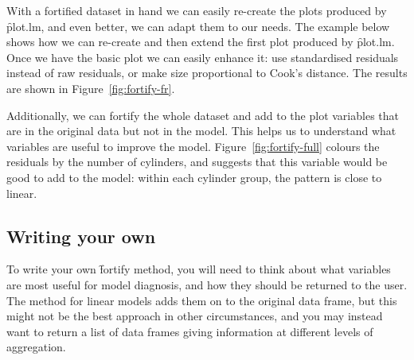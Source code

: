 {With a fortified dataset in hand we can easily re-create the plots produced by \f{plot.lm}, and even better, we can adapt them to our needs. The example below shows how we can re-create and then extend the first plot produced by \f{plot.lm}. Once we have the basic plot we can easily enhance it: use standardised residuals instead of raw residuals, or make size proportional to Cook's distance. The results are shown in Figure~\ref{fig:fortify-fr}.

% 


Additionally, we can fortify the whole dataset and add to the plot variables that are in the original data but not in the model. This helps us to understand what variables are useful to improve the model. Figure~\ref{fig:fortify-full} colours the residuals by the number of cylinders, and suggests that this variable would be good to add to the model: within each cylinder group, the pattern is close to linear.

% 


\subsection{Writing your own}

To write your own \f{fortify} method, you will need to think about what variables are most useful for model diagnosis, and how they should be returned to the user. The method for linear models adds them on to the original data frame, but this might not be the best approach in other circumstances, and you may instead want to return a list of data frames giving information at different levels of aggregation.

}
